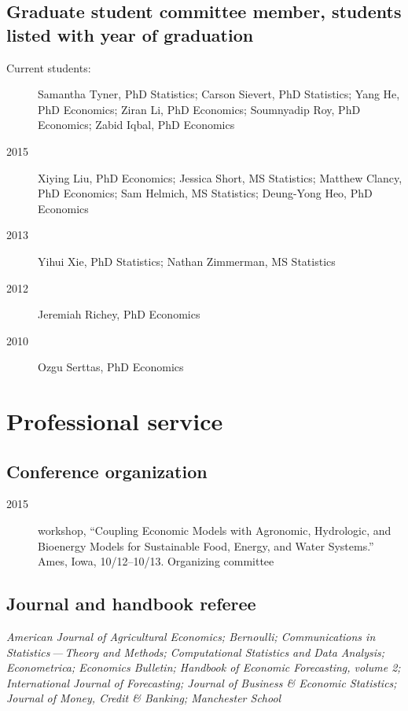 \documentclass[12pt]{article}%
\newcommand{\allcaps}[1]{\textls{\MakeUppercase{#1}}}
\begin{document}
\subsection*{Graduate student committee member, students listed with year of graduation}

\begin{description}
\item[Current students:]
Samantha Tyner, PhD Statistics;
Carson Sievert, PhD Statistics;
Yang He, PhD Economics;
Ziran Li, PhD Economics;
Soumnyadip Roy, PhD Economics;
Zabid Iqbal, PhD Economics
\item[2015] Xiying Liu, PhD Economics;
Jessica Short, MS Statistics;
Matthew Clancy, PhD Economics;
Sam Helmich, MS Statistics;
Deung-Yong Heo, PhD Economics
\item[2013] Yihui Xie, PhD Statistics; Nathan Zimmerman, MS Statistics
\item[2012] Jeremiah Richey, PhD Economics
\item[2010] Ozgu Serttas, PhD Economics
\end{description}

\section*{Professional service}

\subsection*{Conference organization}
\begin{description}
\item[2015] \allcaps{NSF} workshop, ``Coupling Economic Models with
Agronomic, Hydrologic, and Bioenergy Models for Sustainable Food,
Energy, and Water Systems.''  Ames, Iowa, 10/12--10/13. Organizing
committee
\end{description}

\subsection*{Journal and handbook referee}
\textit{American Journal of Agricultural Economics;
Bernoulli;
Communications in Statistics\,---\,Theory and Methods;
Computational Statistics and Data Analysis;
Econometrica;
Economics Bulletin;
Handbook of Economic Forecasting, volume 2;
International Journal of Forecasting;
Journal of Business \& Economic Statistics;
Journal of Money, Credit \& Banking;
Manchester School}
\end{document}
